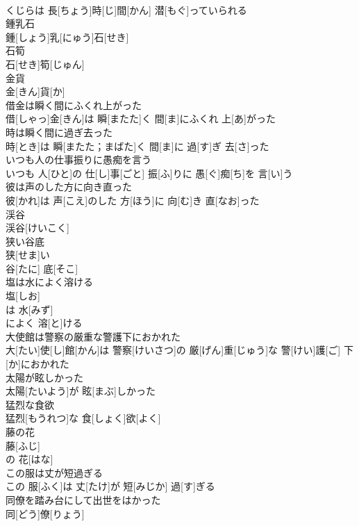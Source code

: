 \documentclass[8pt]{extreport}
\begin{document}
\begin{CJK}{UTF8}{min}
\\	くじらは 長[ちょう]時[じ]間[かん] 潜[もぐ]っていられる
\\	鍾乳石	
\\	鍾[しょう]乳[にゅう]石[せき]
\\	石筍	
\\	石[せき]筍[じゅん]
\\	金貨	
\\	金[きん]貨[か]
\\	借金は瞬く間にふくれ上がった	
\\	借[しゃっ]金[きん]は 瞬[またた]く 間[ま]にふくれ 上[あ]がった
\\	時は瞬く間に過ぎ去った	
\\	時[とき]は 瞬[またた；まばた]く 間[ま]に 過[す]ぎ 去[さ]った
\\	いつも人の仕事振りに愚痴を言う	
\\	いつも 人[ひと]の 仕[し]事[ごと] 振[ふ]りに 愚[ぐ]痴[ち]を 言[い]う
\\	彼は声のした方に向き直った	
\\	彼[かれ]は 声[こえ]のした 方[ほう]に 向[む]き 直[なお]った
\\	渓谷	
\\	渓谷[けいこく]
\\	狭い谷底	
\\	狭[せま]い 
\\	谷[たに] 底[そこ]
\\	塩は水によく溶ける	
\\	塩[しお]
\\	は 水[みず]
\\	によく 溶[と]ける 
\\	大使館は警察の厳重な警護下におかれた	
\\	大[たい]使[し]館[かん]は 警察[けいさつ]の 厳[げん]重[じゅう]な 警[けい]護[ご] 下[か]におかれた
\\	太陽が眩しかった	
\\	太陽[たいよう]が 眩[まぶ]しかった
\\	猛烈な食欲	
\\	猛烈[もうれつ]な 食[しょく]欲[よく]
\\	藤の花	
\\	藤[ふじ]
\\	の 花[はな]
\\	この服は丈が短過ぎる	
\\	この 服[ふく]は 丈[たけ]が 短[みじか] 過[す]ぎる
\\	同僚を踏み台にして出世をはかった	
\\	同[どう]僚[りょう]

\end{CJK}
\end{document}
